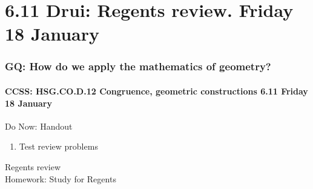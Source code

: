 \documentclass{beamer}
\begin{document}
\section{6.11 Drui: Regents review. Friday 18 January}
  \frame
  {
    \frametitle{GQ: How do we apply the mathematics of geometry?}
    \framesubtitle{CCSS: HSG.CO.D.12 Congruence, geometric constructions  \alert{6.11 Friday 18 January}}

    \begin{block}{Do Now: Handout}
      \begin{enumerate}
        \item Test review problems
      \end{enumerate}
    \end{block}
    Regents review\\[0.5cm]
    Homework: Study for Regents
  }
\end{document}
